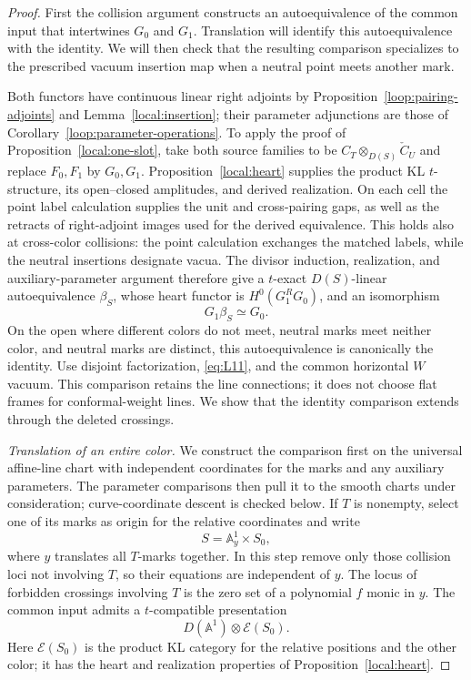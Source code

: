 \begin{proof}
First the collision argument constructs an autoequivalence of the
common input that intertwines $G_0$ and $G_1$.  Translation will
identify this autoequivalence with the identity.  We will then check
that the resulting comparison specializes to the prescribed vacuum
insertion map when a neutral point meets another mark.

Both functors have continuous linear right adjoints by
Proposition~\ref{loop:pairing-adjoints} and
Lemma~\ref{local:insertion}; their parameter adjunctions are those of
Corollary~\ref{loop:parameter-operations}.  To apply the proof of
Proposition~\ref{local:one-slot}, take both source families to be
$C_T\otimes_{D(S)}\check C_U$ and replace $F_0,F_1$ by $G_0,G_1$.
Proposition~\ref{local:heart} supplies the product KL $t$-structure,
its open--closed amplitudes, and derived realization.  On each cell
the point label calculation supplies the unit and cross-pairing gaps,
as well as the retracts of right-adjoint images used for the derived
equivalence.  This holds also at cross-color collisions: the point
calculation exchanges the matched labels, while the neutral
insertions designate vacua.  The divisor induction, realization,
and auxiliary-parameter argument therefore give a $t$-exact
$D(S)$-linear autoequivalence $\beta_S$, whose heart functor is
$H^0(G_1^R G_0)$, and an isomorphism
\begin{equation}\label{eq:L13}
                           G_1\beta_S\simeq G_0.
\end{equation}
On the open where different colors do not meet, neutral marks meet
neither color, and neutral marks are distinct, this autoequivalence
is canonically the identity.  Use disjoint factorization,
\eqref{eq:L11}, and the common horizontal $W$ vacuum.  This comparison
retains the line connections; it does not choose flat frames for
conformal-weight lines.  We show that the identity comparison extends
through the deleted crossings.

\smallskip
\noindent\emph{Translation of an entire color.}
We construct the comparison first on the universal affine-line chart
with independent coordinates for the marks and any auxiliary
parameters.  The parameter comparisons then pull it to the smooth
charts under consideration; curve-coordinate descent is checked
below.  If $T$ is nonempty, select one of its marks as origin for
the relative coordinates and write
\[
                           S=\mathbb A^1_y\times S_0,
\]
where $y$ translates all $T$-marks together.  In this step remove
only those collision loci not involving $T$, so their equations
are independent of $y$.  The locus of forbidden crossings involving
$T$ is the zero set of a polynomial $f$ monic in $y$.
The common input admits a $t$-compatible presentation
\[
           D(\mathbb A^1)\otimes\mathcal E(S_0).
\]
Here $\mathcal E(S_0)$ is the product KL category for the relative
positions and the other color; it has the heart and realization
properties of Proposition~\ref{local:heart}.


\end{proof}
